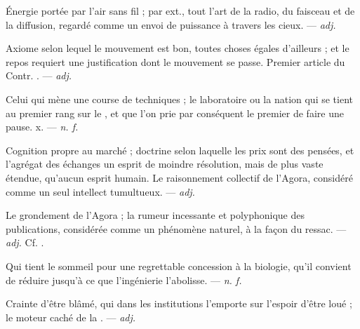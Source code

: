  Énergie portée par l'air sans fil ; par ext., tout l'art de la radio, du faisceau et de la diffusion, regardé comme un envoi de puissance à travers les cieux. ---  \textit{adj.}

 Axiome selon lequel le mouvement est bon, toutes choses égales d'ailleurs ; et le repos requiert une justification dont le mouvement se passe. Premier article du  Contr. . ---  \textit{adj.}

 Celui qui mène une course de techniques ; le laboratoire ou la nation qui se tient au premier rang sur le , et que l'on prie par conséquent le premier de faire une pause.   x. ---  \textit{n. f.}

  Cognition propre au marché ; doctrine selon laquelle les prix sont des pensées, et l'agrégat des échanges un esprit de moindre résolution, mais de plus vaste étendue, qu'aucun esprit humain.   Le raisonnement collectif de l'Agora, considéré comme un seul intellect tumultueux. ---  \textit{adj.}

 Le grondement de l'Agora ; la rumeur incessante et polyphonique des publications, considérée comme un phénomène naturel, à la façon du ressac.  ---  \textit{adj.} Cf. .

 Qui tient le sommeil pour une regrettable concession à la biologie, qu'il convient de réduire jusqu'à ce que l'ingénierie l'abolisse.  ---  \textit{n. f.}

 Crainte d'être blâmé, qui dans les institutions l'emporte sur l'espoir d'être loué ; le moteur caché de la . ---  \textit{adj.}

